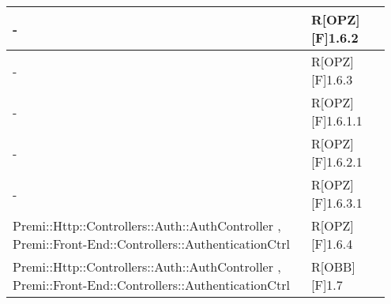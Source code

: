 \begin{table}[h]
\begin{center}
\begin{tabular}{|p{0.75\linewidth}|p{0.2\linewidth}|}
		\midrule
			- & R[OPZ][F]1.6.2 \\
		\midrule
			- & R[OPZ][F]1.6.3 \\
		\midrule
			- & R[OPZ][F]1.6.1.1 \\
		\midrule
			- & R[OPZ][F]1.6.2.1 \\
		\midrule
			- & R[OPZ][F]1.6.3.1 \\
		\midrule
			Premi::Http::Controllers::Auth::AuthController , Premi::Front-End::Controllers::AuthenticationCtrl & R[OPZ][F]1.6.4 \\
		\midrule
			Premi::Http::Controllers::Auth::AuthController , Premi::Front-End::Controllers::AuthenticationCtrl & R[OBB][F]1.7 \\
		
		\bottomrule
	\end{tabular}
\end{center}
\end{table}


